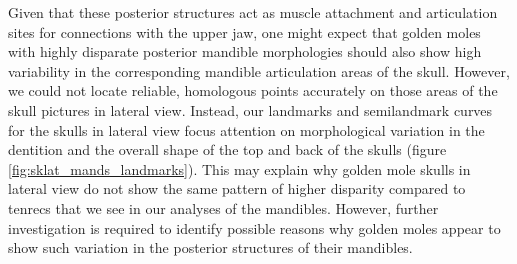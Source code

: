\documentclass[12pt,a4paper]{article}
\begin{document}
		
			
	 Given that these posterior structures act as muscle attachment and articulation sites for connections with the upper jaw, %
	 one might expect that golden moles with highly disparate posterior mandible morphologies should also show high variability in the corresponding mandible articulation areas of the skull. However, we could not locate reliable, homologous points accurately on those areas of the skull pictures in lateral view. Instead, our landmarks and semilandmark curves for the skulls in lateral view focus attention on morphological variation in the dentition and the overall shape of the top and back of the skulls (figure \ref{fig:sklat_mands_landmarks}). This may explain why golden mole skulls in lateral view do not show the same pattern of higher disparity compared to tenrecs that we see in our analyses of the mandibles. However, further investigation is required to identify possible reasons why golden moles appear to show such variation in the posterior structures of their mandibles.
	 	
	
	
\end{document}
